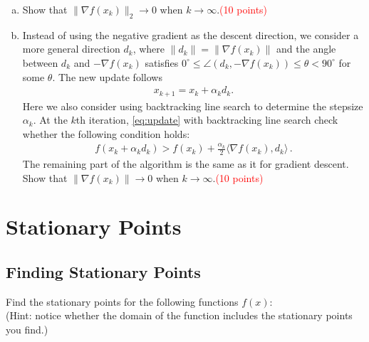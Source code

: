 \documentclass[11pt, a4paper]{article}
\begin{document}
\begin{enumerate}[(a)]
	\item Show that $\|\nabla f(x_k)\|_2\rightarrow 0$ when $k\rightarrow \infty$.\textcolor{red}{(10 points)}\\[1em]
	\item Instead of using the negative gradient as the descent direction, we consider a more general direction $d_k$, where $\|d_k\|=\|\nabla f(x_k)\|$ and the angle between $d_k$ and $-\nabla f(x_k)$ satisfies $0^{\circ}\le \angle(d_k, -\nabla f(x_k))\le \theta<90^{\circ}$ for some $\theta$. The new update follows
	\begin{align}
		x_{k+1}  = x_k+\alpha_kd_k.\label{eq:update}
	\end{align}
	Here we also consider using backtracking line search to determine the stepsize $\alpha_k$. At the $k$th iteration, \eqref{eq:update} with backtracking line search check whether the following condition holds:
	\begin{align}
		f(x_k+\alpha_kd_k) > f(x_k)+\frac{\alpha_k}{2}\langle \nabla f(x_k), d_k\rangle\,.\label{eq:stepsizecondition}
	\end{align}
	The remaining part of the algorithm is the same as it for gradient descent. Show that $\|\nabla f(x_k)\|\rightarrow 0$ when $k\rightarrow \infty$.\textcolor{red}{(10 points)}
\end{enumerate}

\section{Stationary Points}

\subsection{Finding Stationary Points}
Find the stationary points for the following functions $f(x)$: \\
(Hint: notice whether the domain of the function includes the stationary points you find.)
\end{document}
